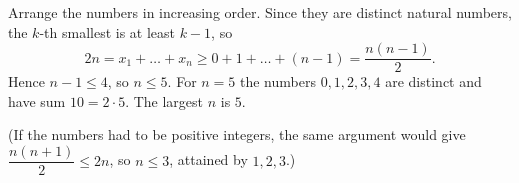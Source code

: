 Arrange the numbers in increasing order. Since they are distinct natural numbers, the $k$-th smallest is at least $k-1$, so
\[
2n=x_1+\dots+x_n\ge0+1+\dots+(n-1)=\dfrac{n(n-1)}{2}.
\]
Hence $n-1\le4$, so $n\le5$. For $n=5$ the numbers $0,1,2,3,4$ are distinct and have sum $10=2\cdot5$. The largest $n$ is $\boxed{5}$.

(If the numbers had to be positive integers, the same argument would give $\dfrac{n(n+1)}{2}\le2n$, so $n\le3$, attained by $1,2,3$.)
